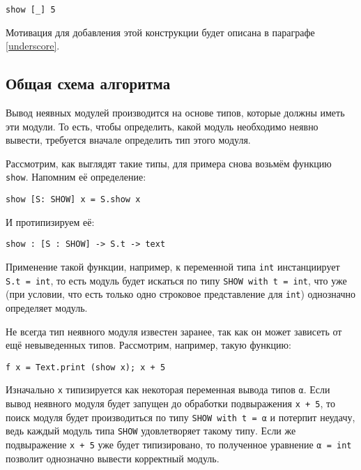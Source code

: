 \documentclass[../diploma.tex]{subfiles}
\begin{document}
\begin{verbatim}
show [_] 5
\end{verbatim}

Мотивация для добавления этой конструкции будет описана в параграфе \ref{underscore}.

\subsection{Общая схема алгоритма}

Вывод неявных модулей производится на основе типов, которые должны иметь эти модули. То есть, чтобы определить, какой модуль необходимо неявно вывести, требуется вначале определить тип этого модуля. 

Рассмотрим, как выглядят такие типы, для примера снова возьмём функцию \texttt{show}. Напомним её определение:

\begin{verbatim}
show [S: SHOW] x = S.show x
\end{verbatim}

И протипизируем её:

\begin{verbatim}
show : [S : SHOW] -> S.t -> text
\end{verbatim}

Применение такой функции, например, к переменной типа \texttt{int} инстанциирует \\\texttt{S.t = int}, то есть модуль будет искаться по типу \texttt{SHOW with t = int}, что уже (при условии, что есть только одно строковое представление для \texttt{int}) однозначно определяет модуль.

Не всегда тип неявного модуля известен заранее, так как он может зависеть от ещё невыведенных типов. Рассмотрим, например, такую функцию:

\begin{verbatim}
f x = Text.print (show x); x + 5
\end{verbatim}

Изначально \texttt{x} типизируется как некоторая переменная вывода типов \texttt{α}. Если вывод неявного модуля будет запущен до обработки подвыражения \texttt{x + 5}, то поиск модуля будет производиться по типу \texttt{SHOW with t = α} и потерпит неудачу, ведь каждый модуль типа \texttt{SHOW} удовлетворяет такому типу. Если же подвыражение \texttt{x + 5} уже будет типизировано, то полученное уравнение \texttt{α = int} позволит однозначно вывести корректный модуль.
\end{document}
